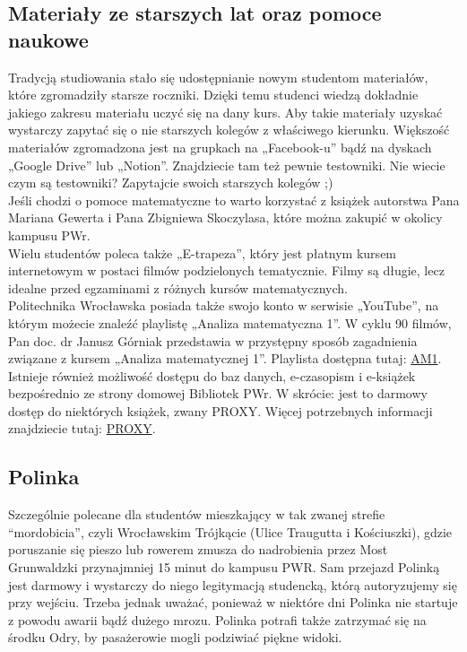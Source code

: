 \documentclass[11pt]{article}
\begin{document}
\subsection{Materiały ze starszych lat oraz pomoce naukowe}
\indent \hspace{0.5cm} Tradycją studiowania stało się udostępnianie nowym studentom materiałów, które zgromadziły starsze roczniki. Dzięki temu studenci wiedzą dokładnie jakiego zakresu materiału uczyć się na dany kurs. Aby takie materiały uzyskać wystarczy zapytać się o nie starszych kolegów z właściwego kierunku. Większość materiałów zgromadzona jest na grupkach na „Facebook-u” bądź na dyskach „Google Drive” lub „Notion”. Znajdziecie tam też pewnie testowniki. Nie wiecie czym są testowniki? Zapytajcie swoich starszych kolegów ;) \\
\indent Jeśli chodzi o pomoce matematyczne to warto korzystać z książek autorstwa Pana Mariana Gewerta i Pana Zbigniewa Skoczylasa, które można zakupić w okolicy kampusu PWr. \\
\indent Wielu studentów poleca także „E-trapeza”, który jest płatnym kursem internetowym w postaci filmów podzielonych tematycznie. Filmy są długie, lecz idealne przed egzaminami z różnych kursów matematycznych. \\
\indent Politechnika Wrocławska posiada także swojo konto w serwisie „YouTube”, na którym możecie znaleźć playlistę „Analiza matematyczna 1”. W cyklu 90 filmów, Pan doc. dr Janusz Górniak przedstawia w przystępny sposób zagadnienia związane z kursem „Analiza matematycznej 1”. Playlista dostępna tutaj: 
{\color{blue}\href{https://www.youtube.com/watch?v=HrFV1NjGP-Y&list=PLRc6a9k_z6Mns4XI3m5k9qzjo8Bv1Qt9H}{AM1}}.\\
\indent Istnieje również możliwość dostępu do baz danych, e-czasopism i e-książek bezpośrednio ze strony domowej Bibliotek PWr. W skrócie: jest to darmowy dostęp do niektórych książek, zwany PROXY. Więcej potrzebnych informacji znajdziecie tutaj: {\color{blue}\href{http://biblioteka.pwr.edu.pl/e-zasoby/zdalny-dostep-proxy}{PROXY}}.\\
\subsection{Polinka}
\indent \hspace{0.5cm} Szczególnie polecane dla studentów mieszkający w tak zwanej strefie “mordobicia”, czyli Wrocławskim Trójkącie (Ulice Traugutta i Kościuszki), gdzie poruszanie się pieszo lub rowerem zmusza do nadrobienia przez Most Grunwaldzki przynajmniej 15 minut do kampusu PWR. Sam przejazd Polinką jest darmowy i wystarczy do niego legitymacją studencką, którą autoryzujemy się przy wejściu. Trzeba jednak uważać, ponieważ w niektóre dni Polinka nie startuje z powodu awarii bądź dużego mrozu. Polinka potrafi także zatrzymać się na środku Odry, by pasażerowie mogli podziwiać piękne widoki.
\end{document}
